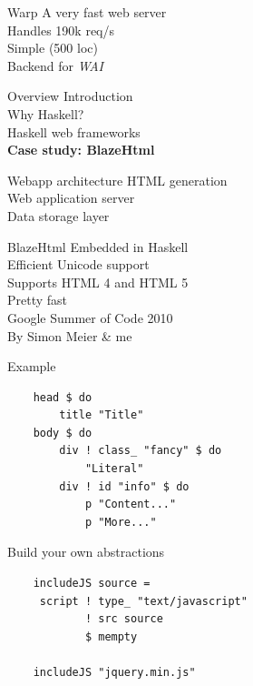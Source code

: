 \documentclass[20pt]{beamer}
\begin{document}
\begin{frame}{Warp}
    A very fast web server \\
    Handles 190k req/s \\
    Simple (500 loc) \\
    Backend for \emph{WAI} \\
\end{frame}


\begin{frame}{Overview}
    Introduction \\
    Why Haskell? \\
    Haskell web frameworks \\
    \textbf{Case study: BlazeHtml} \\
\end{frame}

\begin{frame}{Webapp architecture}
    HTML generation \\
    Web application server \\
    Data storage layer
\end{frame}

\begin{frame}{BlazeHtml}
    Embedded in Haskell \\
    Efficient Unicode support \\
    Supports HTML 4 and HTML 5 \\
    Pretty fast \\
    Google Summer of Code 2010 \\
    By Simon Meier \& me
\end{frame}

\begin{frame}[fragile]{Example}
    \begin{lstlisting}
    head $ do
        title "Title"
    body $ do
        div ! class_ "fancy" $ do
            "Literal"
        div ! id "info" $ do
            p "Content..."
            p "More..."
    \end{lstlisting}
\end{frame}

\begin{frame}[fragile]{Build your own abstractions}
    \begin{lstlisting}
    includeJS source =
     script ! type_ "text/javascript"
            ! src source
            $ mempty

    includeJS "jquery.min.js"
    \end{lstlisting}
\end{frame}
\end{document}
